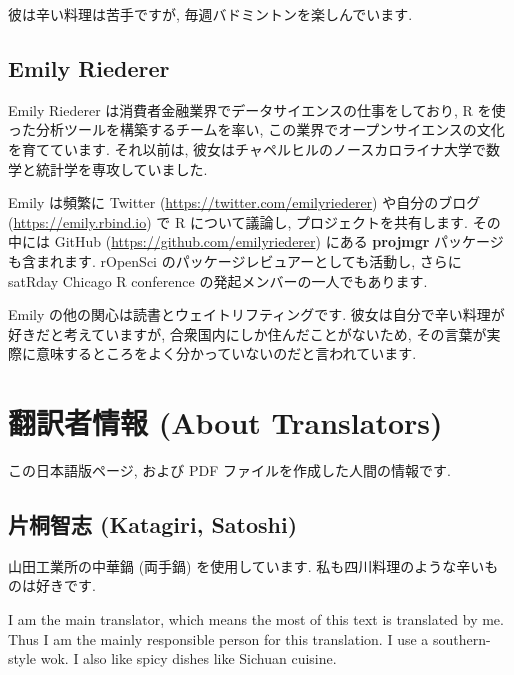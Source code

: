 \documentclass[
  11pt,
  lualatex,ja=standard,jafont=noto]{bxjsreport}
\begin{document}
彼は辛い料理は苦手ですが, 毎週バドミントンを楽しんでいます.

\hypertarget{emily-riederer}{%
\section*{Emily Riederer}\label{emily-riederer}}

Emily Riederer は消費者金融業界でデータサイエンスの仕事をしており, R を使った分析ツールを構築するチームを率い, この業界でオープンサイエンスの文化を育てています. それ以前は, 彼女はチャペルヒルのノースカロライナ大学で数学と統計学を専攻していました.

Emily は頻繁に Twitter (\url{https://twitter.com/emilyriederer}) や自分のブログ (\url{https://emily.rbind.io}) で R について議論し, プロジェクトを共有します. その中には GitHub (\url{https://github.com/emilyriederer}) にある \textbf{projmgr} パッケージも含まれます. rOpenSci のパッケージレビュアーとしても活動し, さらに satRday Chicago R conference の発起メンバーの一人でもあります.

Emily の他の関心は読書とウェイトリフティングです. 彼女は自分で辛い料理が好きだと考えていますが, 合衆国内にしか住んだことがないため, その言葉が実際に意味するところをよく分かっていないのだと言われています.

\hypertarget{translators}{%
\chapter*{翻訳者情報 (About Translators)}\label{translators}}

この日本語版ページ, および PDF ファイルを作成した人間の情報です.

\hypertarget{ux7247ux6850ux667aux5fd7-katagiri-satoshi}{%
\section*{片桐智志 (Katagiri, Satoshi)}\label{ux7247ux6850ux667aux5fd7-katagiri-satoshi}}

山田工業所の中華鍋 (両手鍋) を使用しています. 私も四川料理のような辛いものは好きです.

I am the main translator, which means the most of this text is translated by me. Thus I am the mainly responsible person for this translation. I use a southern-style wok. I also like spicy dishes like Sichuan cuisine.
\end{document}
